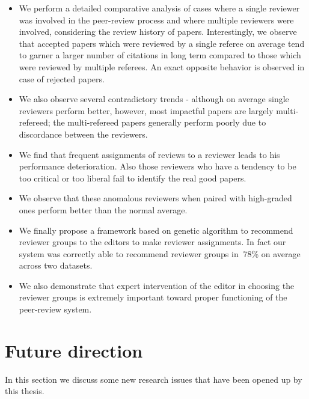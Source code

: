 \begin{itemize}
 \item We perform a detailed comparative analysis of cases where a single reviewer was involved in the peer-review
process and where multiple reviewers were involved, considering the review history of papers. Interestingly, we observe
that accepted papers which were reviewed by a single referee on
average tend to garner a larger number of citations in long term
compared to those which were reviewed by multiple referees. An exact opposite behavior is observed in case of rejected papers.

 \item We also observe several contradictory trends - although on average single reviewers
perform better, however, most impactful papers are largely multi-refereed; the multi-refereed papers generally perform poorly due to
discordance between the reviewers.

 \item We find that frequent assignments of reviews to a reviewer leads to his performance deterioration. 
 Also those reviewers who have a tendency to be too critical or too liberal fail to identify the real good papers.
 
 \item We observe that these anomalous reviewers when paired with high-graded ones perform better than the normal average. 
 
 \item We finally propose a framework based on genetic algorithm to recommend reviewer groups to the editors
to make 
reviewer assignments. In fact our system was correctly
able to recommend reviewer groups in $~$78\% on average across two datasets.

\item We also demonstrate that expert intervention of the editor in choosing the reviewer groups is
extremely important toward proper functioning of the peer-review
system.
\end{itemize}



\section{Future direction} In this section we discuss some new research issues that have been opened up by this thesis.
